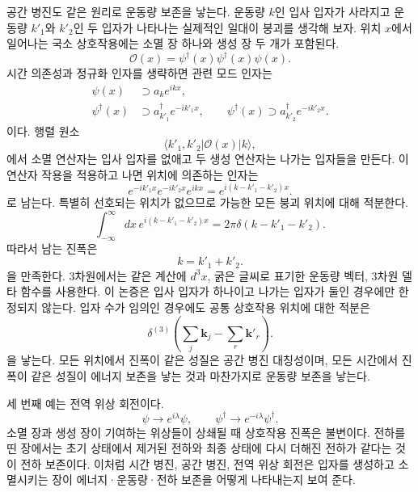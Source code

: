 공간 병진도 같은 원리로 운동량 보존을 낳는다. 운동량 \(k\)인 입사 입자가 사라지고 운동량 \(k'_1\)와 \(k'_2\)인 두 입자가 나타나는 실제적인 일대이 붕괴를 생각해 보자. 위치 \(x\)에서 일어나는 국소 상호작용에는 소멸 장 하나와 생성 장 두 개가 포함된다.
\begin{equation}
\mathcal{O}(x)=\psi^\dagger(x)\psi^\dagger(x)\psi(x).
\end{equation}
시간 의존성과 정규화 인자를 생략하면 관련 모드 인자는
\begin{align}
\psi(x)&\supset a_k e^{ikx},
\\
\psi^\dagger(x)&\supset a_{k'_1}^\dagger e^{-ik'_1x},
\qquad
\psi^\dagger(x)\supset a_{k'_2}^\dagger e^{-ik'_2x}.
\end{align}
이다. 행렬 원소
\begin{equation}
\langle k'_1,k'_2|\mathcal{O}(x)|k\rangle,
\end{equation}
에서 소멸 연산자는 입사 입자를 없애고 두 생성 연산자는 나가는 입자들을 만든다. 이 연산자 작용을 적용하고 나면 위치에 의존하는 인자는
\begin{equation}
e^{-ik'_1x}e^{-ik'_2x}e^{ikx}
=e^{i(k-k'_1-k'_2)x}.
\end{equation}
로 남는다. 특별히 선호되는 위치가 없으므로 가능한 모든 붕괴 위치에 대해 적분한다.
\begin{equation}
\int_{-\infty}^{\infty}dx\,
e^{i(k-k'_1-k'_2)x}
=2\pi\delta(k-k'_1-k'_2).
\end{equation}
따라서 남는 진폭은
\begin{equation}
k=k'_1+k'_2.
\end{equation}
을 만족한다. 3차원에서는 같은 계산에 \(d^3x\), 굵은 글씨로 표기한 운동량 벡터, 3차원 델타 함수를 사용한다. 이 논증은 입사 입자가 하나이고 나가는 입자가 둘인 경우에만 한정되지 않는다. 입자 수가 임의인 경우에도 공통 상호작용 위치에 대한 적분은
\begin{equation}
\delta^{(3)}\!\left(
\sum_j\mathbf{k}_j-\sum_r\mathbf{k}'_r
\right).
\end{equation}
을 낳는다. 모든 위치에서 진폭이 같은 성질은 공간 병진 대칭성이며, 모든 시간에서 진폭이 같은 성질이 에너지 보존을 낳는 것과 마찬가지로 운동량 보존을 낳는다.

세 번째 예는 전역 위상 회전이다.
\begin{equation}
\psi\longrightarrow e^{i\lambda}\psi,
\qquad
\psi^\dagger\longrightarrow e^{-i\lambda}\psi^\dagger.
\end{equation}
소멸 장과 생성 장이 기여하는 위상들이 상쇄될 때 상호작용 진폭은 불변이다. 전하를 띤 장에서는 초기 상태에서 제거된 전하와 최종 상태에 다시 더해진 전하가 같다는 것이 전하 보존이다. 이처럼 시간 병진, 공간 병진, 전역 위상 회전은 입자를 생성하고 소멸시키는 장이 에너지·운동량·전하 보존을 어떻게 나타내는지 보여 준다.

